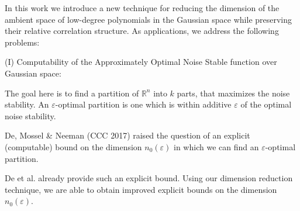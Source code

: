 \documentclass[11pt]{article}
\newcommand{\Red}[1]{\textcolor{red}{#1}}
\newcommand{\inbrace}[1]{\left \{ #1 \right \}}
\newcommand{\set}[1]{\inbrace{#1}}
\newcommand{\bit}{\set{0,1}}
\newcommand{\eps}{\varepsilon}
\begin{document}
\begin{abstract}
\begin{enumerate}[(I)]
		While Ghazi et al. answered the challenge in the special case where $Q$ is a joint distribution over $\bit \times \bit$, it remained open to answer the case where $Q$ is a distribution over larger alphabet, say $[k] \times [k]$ for $k > 2$. Recently De, Mossel \& Neeman (in a follow-up work), address this challenge for all $k \ge 2$. In this work, we are able to recover this result as well, with improved explicit bounds on $n_0(\eps)$.
	\end{enumerate}
	

	
Our technique of dimension reduction for low-degree polynomials is simple and analogous to the Johnson-Lindenstrauss lemma, and could be of independent interest.
	
\end{abstract}

\iffalse

In this work we introduce a new technique for reducing the dimension of the ambient space of low-degree polynomials in the Gaussian space while preserving their relative correlation structure. As applications, we address the following problems:

(I) Computability of the Approximately Optimal Noise Stable function over Gaussian space:

The goal here is to find a partition of $\mathbb{R}^n$ into $k$ parts, that maximizes the noise stability. An $\varepsilon$-optimal partition is one which is within additive $\varepsilon$ of the optimal noise stability.

De, Mossel & Neeman (CCC 2017) raised the question of an explicit (computable) bound on the dimension $n_0(\varepsilon)$ in which we can find an $\varepsilon$-optimal partition.

De et al. already provide such an explicit bound. Using our dimension reduction technique, we are able to obtain improved explicit bounds on the dimension $n_0(\varepsilon)$.
	
\end{document}
